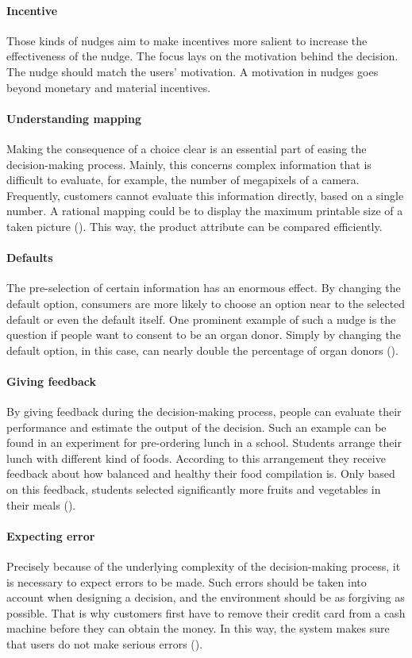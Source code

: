 \paragraph{Incentive}
Those kinds of nudges aim to make incentives more salient to increase the effectiveness of the nudge. The focus lays on the motivation behind the decision. The nudge should match the users' motivation. A motivation in nudges goes beyond monetary and material incentives.
\paragraph{Understanding mapping}
Making the consequence of a choice clear is an essential part of easing the decision-making process. Mainly, this concerns complex information that is difficult to evaluate, for example, the number of megapixels of a camera. Frequently, customers cannot evaluate this information directly, based on a single number. A rational mapping could be to display the maximum printable size of a taken picture (\cite{weinmann_digital_2016}). This way, the product attribute can be compared efficiently.
\paragraph{Defaults}
The pre-selection of certain information has an enormous effect. By changing the default option, consumers are more likely to choose an option near to the selected default or even the default itself. One prominent example of such a nudge is the question if people want to consent to be an organ donor. Simply by changing the default option, in this case, can nearly double the percentage of organ donors (\cite{johnson_defaults_2003}). 
\paragraph{Giving feedback}
By giving feedback during the decision-making process, people can evaluate their performance and estimate the output of the decision. Such an example can be found in an experiment for pre-ordering lunch in a school. Students arrange their lunch with different kind of foods. According to this arrangement they receive feedback about how balanced and healthy their food compilation is. Only based on this feedback, students selected significantly more fruits and vegetables in their meals (\cite{miller_effects_2016}).
\paragraph{Expecting error}
Precisely because of the underlying complexity of the decision-making process, it is necessary to expect errors to be made. Such errors should be taken into account when designing a decision, and the environment should be as forgiving as possible. That is why customers first have to remove their credit card from a cash machine before they can obtain the money. In this way, the system makes sure that users do not make serious errors (\cite{weinmann_digital_2016}).
